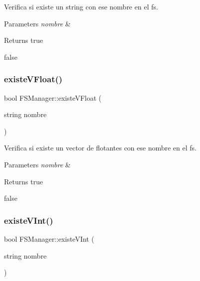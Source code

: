 Verifica si existe un string con ese nombre en el fs. 


\begin{DoxyParams}{Parameters}
{\em nombre} & \\
\hline
\end{DoxyParams}
\begin{DoxyReturn}{Returns}
true 

false 
\end{DoxyReturn}
\mbox{\label{classFSManager_a63759864d11b386395f462a7876c2e89}} 
\subsubsection{\texorpdfstring{existe\+V\+Float()}{existeVFloat()}}
{\footnotesize\ttfamily bool F\+S\+Manager\+::existe\+V\+Float (\begin{DoxyParamCaption}\item[{string}]{nombre }\end{DoxyParamCaption})\hspace{0.3cm}{\ttfamily [inline]}}



Verifica si existe un vector de flotantes con ese nombre en el fs. 


\begin{DoxyParams}{Parameters}
{\em nombre} & \\
\hline
\end{DoxyParams}
\begin{DoxyReturn}{Returns}
true 

false 
\end{DoxyReturn}
\mbox{\label{classFSManager_a500170a86c9fcaddd716fe962283742c}} 
\subsubsection{\texorpdfstring{existe\+V\+Int()}{existeVInt()}}
{\footnotesize\ttfamily bool F\+S\+Manager\+::existe\+V\+Int (\begin{DoxyParamCaption}\item[{string}]{nombre }\end{DoxyParamCaption})\hspace{0.3cm}{\ttfamily [inline]}}



